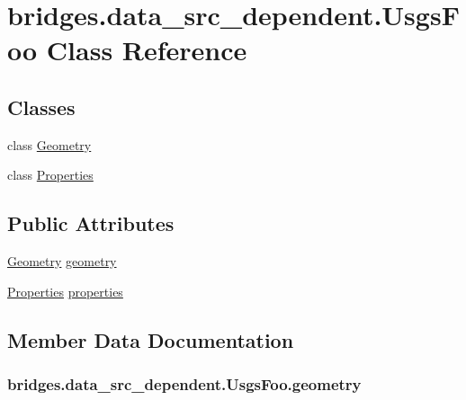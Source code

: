 \hypertarget{classbridges_1_1data__src__dependent_1_1_usgs_foo}{}\section{bridges.\+data\+\_\+src\+\_\+dependent.\+Usgs\+Foo Class Reference}
\label{classbridges_1_1data__src__dependent_1_1_usgs_foo}
\subsection*{Classes}
\begin{DoxyCompactItemize}
\item 
class \hyperlink{classbridges_1_1data__src__dependent_1_1_usgs_foo_1_1_geometry}{Geometry}
\item 
class \hyperlink{classbridges_1_1data__src__dependent_1_1_usgs_foo_1_1_properties}{Properties}
\end{DoxyCompactItemize}
\subsection*{Public Attributes}
\begin{DoxyCompactItemize}
\item 
\hyperlink{classbridges_1_1data__src__dependent_1_1_usgs_foo_1_1_geometry}{Geometry} \hyperlink{classbridges_1_1data__src__dependent_1_1_usgs_foo_af660c68abc5a7feac8c76f025ff9847e}{geometry}
\item 
\hyperlink{classbridges_1_1data__src__dependent_1_1_usgs_foo_1_1_properties}{Properties} \hyperlink{classbridges_1_1data__src__dependent_1_1_usgs_foo_a030d83e136f146824b5bda34a4c6fd1c}{properties}
\end{DoxyCompactItemize}


\subsection{Member Data Documentation}
\hypertarget{classbridges_1_1data__src__dependent_1_1_usgs_foo_af660c68abc5a7feac8c76f025ff9847e}{}
\subsubsection[{geometry}]{ bridges.\+data\+\_\+src\+\_\+dependent.\+Usgs\+Foo.\+geometry}\label{classbridges_1_1data__src__dependent_1_1_usgs_foo_af660c68abc5a7feac8c76f025ff9847e}
\hypertarget{classbridges_1_1data__src__dependent_1_1_usgs_foo_a030d83e136f146824b5bda34a4c6fd1c}{}
